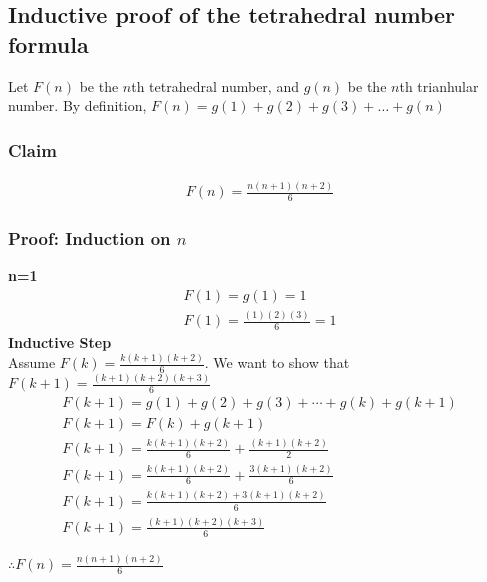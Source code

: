 \subsection*{Inductive proof of the tetrahedral number formula}

Let $F(n)$ be the $n$th tetrahedral number, and $g(n)$ be the $n$th trianhular
number. By definition, $F(n) = g(1)+g(2)+g(3)+\ldots+g(n)$

\subsubsection*{Claim}
\begin{align*}
F(n) = \frac{n(n+1)(n+2)}{6}
\end{align*}

\subsubsection*{Proof: Induction on $n$}
\quad\textbf{n=1}
\begin{align*}
F(1)=g(1)=1\\
F(1)=\frac{(1)(2)(3)}{6}=1
\end{align*}
\quad\textbf{Inductive Step}\\

Assume $F(k) = \frac{k(k+1)(k+2)}{6}$. We want to show that $F(k+1) =
\frac{(k+1)(k+2)(k+3)}{6}$
\begin{align*}
F(k + 1) =  g(1) + g(2) + g(3) + \cdots + g(k) + g(k+1)\\
	 F(k + 1) =  F(k) + g(k+1)\\
	 F(k + 1) =   \frac{k(k+1)(k+2)}{6} + \frac{(k+1)(k+2)}{2}\\
	 F(k + 1) =   \frac{k(k+1)(k+2)}{6} + \frac{3(k+1)(k+2)}{6}\\
	 F(k + 1) =   \frac{k(k+1)(k+2) + 3(k+1)(k+2)}{6}\\
	 F(k + 1) =   \frac{(k+1)(k+2) (k+3)}{6}
\end{align*}

\begin{center}$\therefore F(n) = \frac{n(n+1)(n+2)}{6}$ \end{center}